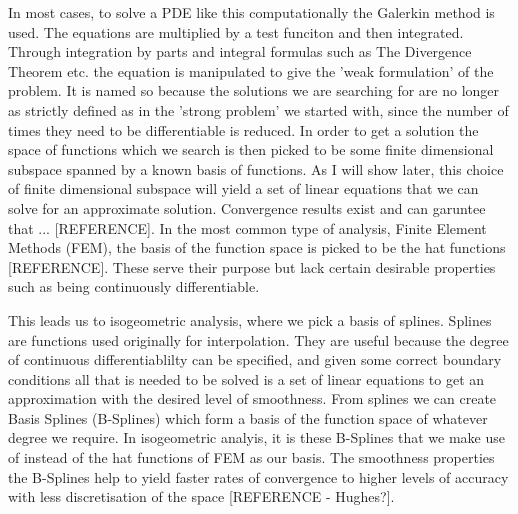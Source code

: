 \documentclass[a4paper, 11pt]{article}
\begin{document}
In most cases, to solve a PDE like this computationally the Galerkin method is used. The equations are multiplied by a test funciton and then integrated. Through integration by parts and integral formulas such as The Divergence Theorem etc. the equation is manipulated to give the 'weak formulation' of the problem. It is named so because the solutions we are searching for are no longer as strictly defined as in the 'strong problem' we started with, since the number of times they need to be differentiable is reduced. In order to get a solution the space of functions which we search is then picked to be some finite dimensional subspace spanned by a known basis of functions. As I will show later, this choice of finite dimensional subspace will yield a set of linear equations that we can solve for an approximate solution. Convergence results exist and can garuntee that ... [REFERENCE]. In the most common type of analysis, Finite Element Methods (FEM), the basis of the function space is picked to be the hat functions [REFERENCE]. These serve their purpose but lack certain desirable properties such as being continuously differentiable.

This leads us to isogeometric analysis, where we pick a basis of splines. Splines are functions used originally for interpolation. They are useful because the degree of continuous differentiablilty can be specified, and given some correct boundary conditions all that is needed to be solved is a set of linear equations to get an approximation with the desired level of smoothness. From splines we can create Basis Splines (B-Splines) which form a basis of the function space of whatever degree we require. In isogeometric analyis, it is these B-Splines that we make use of instead of the hat functions of FEM as our basis. The smoothness properties the B-Splines help to yield faster rates of convergence to higher levels of accuracy with less discretisation of the space [REFERENCE - Hughes?].

\pagebreak
\end{document}
